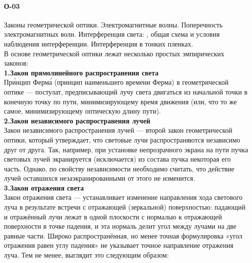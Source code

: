 


\paragraph{О-03}
Законы геометрической оптики. Электромагнитные волны. Поперечность электромагнитных волн. Интерференция света: , общая схема и условия наблюдения интерференции. Интерференция в тонких пленках.\\

В основе геометрической оптики лежат несколько простых эмпирических законов:\\
	\textbf{1.Закон прямолинейного распространения света}\\
	При́нцип Ферма́ (принцип наименьшего времени Ферма) в геометрической оптике — постулат, предписывающий лучу света двигаться из начальной точки в конечную точку по пути, минимизирующему время движения (или, что то же самое, минимизирующему оптическую длину пути). \\
	\textbf{2.Закон независимого распространения лучей}\\
	Закон независимого распространения лучей — второй закон геометрической оптики, который утверждает, что световые лучи распространяются независимо друг от друга. Так, например, при установке непрозрачного экрана на пути пучка световых лучей экранируется (исключается) из состава пучка некоторая его часть. Однако, по свойству независимости необходимо считать, что действие лучей оставшихся незаэкранированными от этого не изменится.\\
	\textbf{3.Закон отражения света}\\
	Закон отражения света — устанавливает изменение направления хода светового луча в результате встречи с отражающей (зеркальной) поверхностью: падающий и отражённый лучи лежат в одной плоскости с нормалью к отражающей поверхности в точке падения, и эта нормаль делит угол между лучами на две равные части. Широко распространённая, но менее точная формулировка «угол отражения равен углу падения» не указывает точное направление отражения луча. Тем не менее, выглядит это следующим образом:
	
